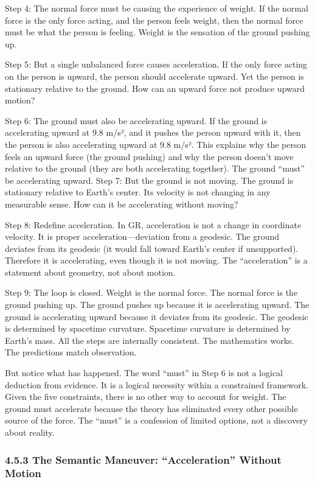 \documentclass[11pt]{article}
\begin{document}
Step 4: The normal force must be causing the experience of weight. If the normal force is the only force acting, and the person feels weight, then the normal force must be what the person is feeling. Weight is the sensation of the ground pushing up.

Step 5: But a single unbalanced force causes acceleration. If the only force acting on the person is upward, the person should accelerate upward. Yet the person is stationary relative to the ground. How can an upward force not produce upward motion?

Step 6: The ground must also be accelerating upward. If the ground is accelerating upward at 9.8 m/s², and it pushes the person upward with it, then the person is also accelerating upward at 9.8 m/s². This explains why the person feels an upward force (the ground pushing) and why the person doesn't move relative to the ground (they are both accelerating together). The ground ``must'' be accelerating upward. Step 7: But the ground is not moving. The ground is stationary relative to Earth's center. Its velocity is not changing in any measurable sense. How can it be accelerating without moving?

Step 8: Redefine acceleration. In GR, acceleration is not a change in coordinate velocity. It is proper acceleration---deviation from a geodesic. The ground deviates from its geodesic (it would fall toward Earth's center if unsupported). Therefore it is accelerating, even though it is not moving. The ``acceleration'' is a statement about geometry, not about motion.

Step 9: The loop is closed. Weight is the normal force. The normal force is the ground pushing up. The ground pushes up because it is accelerating upward. The ground is accelerating upward because it deviates from its geodesic. The geodesic is determined by spacetime curvature. Spacetime curvature is determined by Earth's mass. All the steps are internally consistent. The mathematics works. The predictions match observation.

But notice what has happened. The word ``must'' in Step 6 is not a logical deduction from evidence. It is a logical necessity within a constrained framework. Given the five constraints, there is no other way to account for weight. The ground must accelerate because the theory has eliminated every other possible source of the force. The ``must'' is a confession of limited options, not a discovery about reality.

\subsubsection{4.5.3 The Semantic Maneuver: ``Acceleration'' Without Motion}
\end{document}
